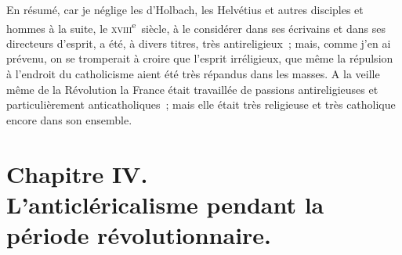 \documentclass[french,twoside]{book} %
\newcommand{\astertri}{\medskip\par\centerline{\color{rubric}\large\selectfont{\syms ✻\,✻\,✻}}\medskip\par}%
\begin{document}
\astertri

\noindent En résumé, car je néglige les d’Holbach, les Helvétius et autres disciples et hommes à la suite, le \textsc{xviii}\textsuperscript{e} siècle, à le considérer dans ses écrivains et dans ses directeurs d’esprit, a été, à divers titres, très antireligieux ; mais, comme j’en ai prévenu, on se tromperait à croire que l’esprit irréligieux, que même la répulsion à l’endroit du catholicisme aient été très répandus dans les masses. A la veille même de la Révolution la France était travaillée de passions antireligieuses et particulièrement anticatholiques ; mais elle était très religieuse et très catholique encore dans son ensemble.
 \section[{Chapitre IV. L’anticléricalisme pendant la période révolutionnaire.}]{Chapitre IV.\\
L’anticléricalisme pendant la période révolutionnaire.}\renewcommand{\leftmark}{Chapitre IV.\\
L’anticléricalisme pendant la période révolutionnaire.}
\end{document}
